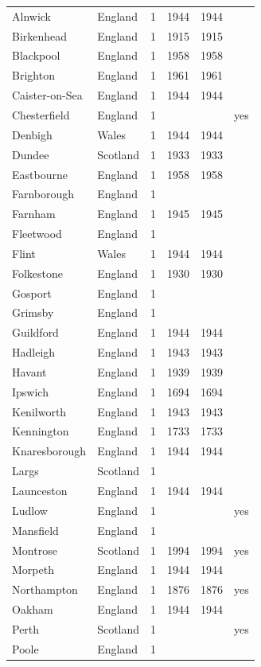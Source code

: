 \documentclass[11pt,a4paper]{article}
\begin{document}
{\begin{longtable}{llrrrl}
Alnwick & England & 1 & 1944 & 1944 & \\
Birkenhead & England & 1 & 1915 & 1915 & \\
Blackpool & England & 1 & 1958 & 1958 & \\
Brighton & England & 1 & 1961 & 1961 & \\
Caister-on-Sea & England & 1 & 1944 & 1944 & \\
Chesterfield & England & 1 &  &  & yes\\
Denbigh & Wales & 1 & 1944 & 1944 & \\
Dundee & Scotland & 1 & 1933 & 1933 & \\
Eastbourne & England & 1 & 1958 & 1958 & \\
Farnborough & England & 1 &  &  & \\
Farnham & England & 1 & 1945 & 1945 & \\
Fleetwood & England & 1 &  &  & \\
Flint & Wales & 1 & 1944 & 1944 & \\
Folkestone & England & 1 & 1930 & 1930 & \\
Gosport & England & 1 &  &  & \\
Grimsby & England & 1 &  &  & \\
Guildford & England & 1 & 1944 & 1944 & \\
Hadleigh & England & 1 & 1943 & 1943 & \\
Havant & England & 1 & 1939 & 1939 & \\
Ipswich & England & 1 & 1694 & 1694 & \\
Kenilworth & England & 1 & 1943 & 1943 & \\
Kennington & England & 1 & 1733 & 1733 & \\
Knaresborough & England & 1 & 1944 & 1944 & \\
Largs & Scotland & 1 &  &  & \\
Launceston & England & 1 & 1944 & 1944 & \\
Ludlow & England & 1 &  &  & yes\\
Mansfield & England & 1 &  &  & \\
Montrose & Scotland & 1 & 1994 & 1994 & yes\\
Morpeth & England & 1 & 1944 & 1944 & \\
Northampton & England & 1 & 1876 & 1876 & yes\\
Oakham & England & 1 & 1944 & 1944 & \\
Perth & Scotland & 1 &  &  & yes\\
Poole & England & 1 &  &  & \\

\end{longtable}}
\end{document}
